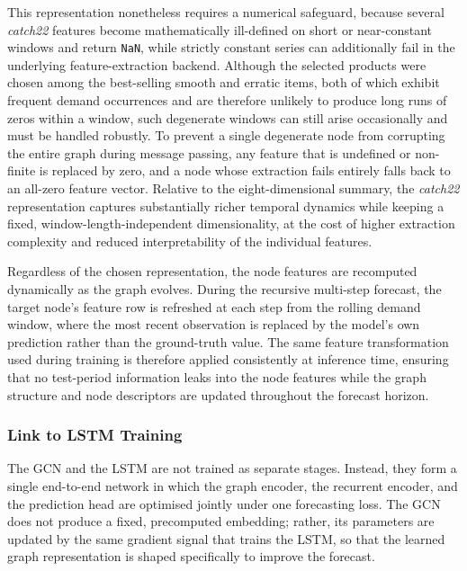 This representation nonetheless requires a numerical safeguard, because several
\textit{catch22} features become mathematically ill-defined on short or
near-constant windows and return \texttt{NaN}, while strictly constant series
can additionally fail in the underlying feature-extraction backend. Although the
selected products were chosen among the best-selling smooth and erratic items,
both of which exhibit frequent demand occurrences and are therefore unlikely to
produce long runs of zeros within a window, such degenerate windows can still
arise occasionally and must be handled robustly. To prevent a single degenerate
node from corrupting the entire graph during message passing, any feature that
is undefined or non-finite is replaced by zero, and a node whose extraction
fails entirely falls back to an all-zero feature vector. Relative to the
eight-dimensional summary, the \textit{catch22} representation captures
substantially richer temporal dynamics while keeping a fixed,
window-length-independent dimensionality, at the cost of higher extraction
complexity and reduced interpretability of the individual features.

Regardless of the chosen representation, the node features are recomputed
dynamically as the graph evolves. During the recursive multi-step forecast,
the target node's feature row is refreshed at each step from the rolling demand
window, where the most recent observation is replaced by the model's own
prediction rather than the ground-truth value. The same feature transformation
used during training is therefore applied consistently at inference time,
ensuring that no test-period information leaks into the node features while the
graph structure and node descriptors are updated throughout the forecast
horizon.
\subsubsection{Link to LSTM Training}

The GCN and the LSTM are not trained as separate stages. Instead, they form a
single end-to-end network in which the graph encoder, the recurrent encoder,
and the prediction head are optimised jointly under one forecasting loss. The
GCN does not produce a fixed, precomputed embedding; rather, its parameters are
updated by the same gradient signal that trains the LSTM, so that the learned
graph representation is shaped specifically to improve the forecast.

